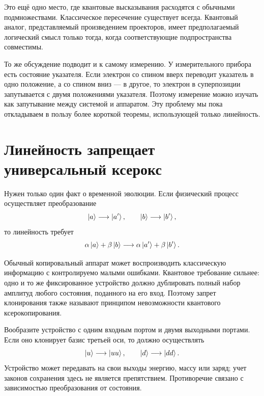 Это ещё одно место, где квантовые высказывания расходятся с обычными подмножествами. Классическое пересечение существует всегда. Квантовый аналог, представляемый произведением проекторов, имеет предполагаемый логический смысл только тогда, когда соответствующие подпространства совместимы.

То же обсуждение подводит и к самому измерению. У измерительного прибора есть состояние указателя. Если электрон со спином вверх переводит указатель в одно положение, а со спином вниз — в другое, то электрон в суперпозиции запутывается с двумя положениями указателя. Поэтому измерение можно изучать как запутывание между системой и аппаратом. Эту проблему мы пока откладываем в пользу более короткой теоремы, использующей только линейность.

\begin{classroomqa}
\end{classroomqa}

\section{Линейность запрещает универсальный ксерокс}

Нужен только один факт о временной эволюции. Если физический процесс осуществляет преобразование
\begin{equation}
  \left\lvert a\right\rangle\longrightarrow\left\lvert a'\right\rangle,
  \qquad
  \left\lvert b\right\rangle\longrightarrow\left\lvert b'\right\rangle,
\end{equation}
то линейность требует
\begin{equation}
  \alpha\left\lvert a\right\rangle+\beta\left\lvert b\right\rangle
  \longrightarrow
  \alpha\left\lvert a'\right\rangle+\beta\left\lvert b'\right\rangle.
  \label{eq:l05-linearity}
\end{equation}

Обычный копировальный аппарат может воспроизводить классическую информацию с контролируемо малыми ошибками. Квантовое требование сильнее: одно и то же фиксированное устройство должно дублировать полный набор амплитуд любого состояния, поданного на его вход. Поэтому запрет клонирования также называют принципом невозможности квантового ксерокопирования.

Вообразите устройство с одним входным портом и двумя выходными портами. Если оно клонирует базис третьей оси, то должно осуществлять
\begin{equation}
  \left\lvert u\right\rangle\longrightarrow\left\lvert uu\right\rangle,
  \qquad
  \left\lvert d\right\rangle\longrightarrow\left\lvert dd\right\rangle.
  \label{eq:l05-clone-basis}
\end{equation}
Устройство может передавать на свои выходы энергию, массу или заряд; учет законов сохранения здесь не является препятствием. Противоречие связано с зависимостью преобразования от состояния.

